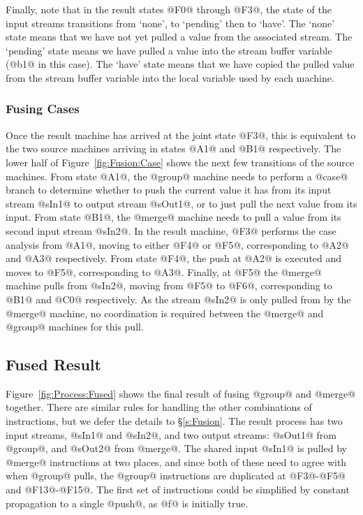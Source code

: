 Finally, note that in the result states @F0@ through @F3@, the state of the input streams transitions from `none', to `pending' then to `have'. The `none' state means that we have not yet pulled a value from the associated stream. The `pending' state means we have pulled a value into the stream buffer variable (@b1@ in this case). The `have' state means that we have copied the pulled value from the stream buffer variable into the local variable used by each machine. 



\subsubsection{Fusing Cases}
Once the result machine has arrived at the joint state @F3@, this is equivalent to the two source machines arriving in states @A1@ and @B1@ respectively. The lower half of Figure~\ref{fig:Fusion:Case} shows the next few transitions of the source machines. From state @A1@, the @group@ machine needs to perform a @case@ branch to determine whether to push the current value it has from its input stream @sIn1@ to output stream @sOut1@, or to just pull the next value from its input. From state @B1@, the @merge@ machine needs to pull a value from its second input stream @sIn2@. In the result machine, @F3@ performs the case analysis from @A1@, moving to either @F4@ or @F5@, corresponding to @A2@ and @A3@ respectively. From state @F4@, the push at @A2@ is executed and moves to @F5@, corresponding to @A3@. Finally, at @F5@ the @merge@ machine pulls from @sIn2@, moving from @F5@ to @F6@, corresponding to @B1@ and @C0@ respectively. As the stream @sIn2@ is only pulled from by the @merge@ machine, no coordination is required between the @merge@ and @group@ machines for this pull.


\subsection{Fused Result}

Figure~\ref{fig:Process:Fused} shows the final result of fusing @group@ and @merge@ together. There are similar rules for handling the other combinations of instructions, but we defer the details to \S\ref{s:Fusion}. The result process has two input streams, @sIn1@ and @sIn2@, and two output streams: @sOut1@ from @group@, and @sOut2@ from @merge@. The shared input @sIn1@ is pulled by @merge@ instructions at two places, and since both of these need to agree with when @group@ pulls, the @group@ instructions are duplicated at @F3@-@F5@ and @F13@-@F15@. The first set of instructions could be simplified by constant propagation to a single @push@, as @f@ is initially true.

